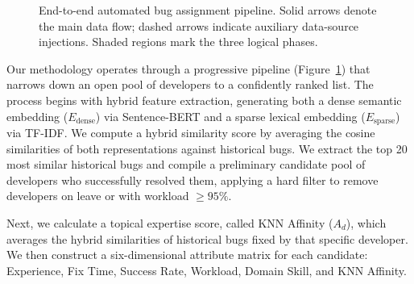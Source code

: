 \documentclass[sigconf,review,anonymous]{acmart}
\begin{document}
\begin{figure}[t]
{%
}
\caption{End-to-end automated bug assignment pipeline. Solid arrows denote
         the main data flow; dashed arrows indicate auxiliary data-source
         injections. Shaded regions mark the three logical phases.}
\label{fig:pipeline}
\end{figure}

Our methodology operates through a progressive pipeline (Figure~\ref{fig:pipeline}) that narrows down an open pool of developers to a confidently ranked list. The process begins with hybrid feature extraction, generating both a dense semantic embedding ($E_{\text{dense}}$) via Sentence-BERT and a sparse lexical embedding ($E_{\text{sparse}}$) via TF-IDF. We compute a hybrid similarity score by averaging the cosine similarities of both representations against historical bugs. We extract the top 20 most similar historical bugs and compile a preliminary candidate pool of developers who successfully resolved them, applying a hard filter to remove developers on leave or with workload $\geq 95\%$.

Next, we calculate a topical expertise score, called KNN Affinity ($A_d$), which averages the hybrid similarities of historical bugs fixed by that specific developer. We then construct a six-dimensional attribute matrix for each candidate: Experience, Fix Time, Success Rate, Workload, Domain Skill, and KNN Affinity.
\end{document}
